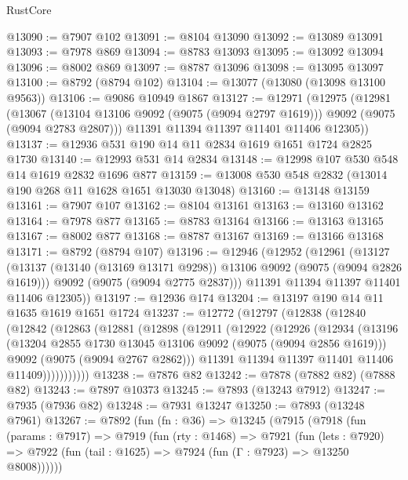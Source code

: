 \begin{lexlean}{RustCore}
\begin{coremodule}
@13090 := @7907 @102
@13091 := @8104 @13090
@13092 := @13089 @13091
@13093 := @7978 @869
@13094 := @8783 @13093
@13095 := @13092 @13094
@13096 := @8002 @869
@13097 := @8787 @13096
@13098 := @13095 @13097
@13100 := @8792 (@8794 @102)
@13104 := @13077 (@13080 (@13098 @13100 @9563))
@13106 := @9086 @10949 @1867
@13127 := @12971
    (@12975
      (@12981
        (@13067 (@13104 @13106 @9092 (@9075 (@9094 @2797 @1619))) @9092 (@9075 (@9094 @2783 @2807)))
        @11391
        @11394
        @11397
        @11401
        @11406
        @12305))
@13137 := @12936 @531 @190 @14 @11 @2834 @1619 @1651 @1724 @2825 @1730
@13140 := @12993 @531 @14 @2834
@13148 := @12998 @107 @530 @548 @14 @1619 @2832 @1696 @877
@13159 := @13008 @530 @548 @2832 (@13014 @190 @268 @11 @1628 @1651 @13030 @13048)
@13160 := @13148 @13159
@13161 := @7907 @107
@13162 := @8104 @13161
@13163 := @13160 @13162
@13164 := @7978 @877
@13165 := @8783 @13164
@13166 := @13163 @13165
@13167 := @8002 @877
@13168 := @8787 @13167
@13169 := @13166 @13168
@13171 := @8792 (@8794 @107)
@13196 := @12946
    (@12952
      (@12961
        (@13127
          (@13137 (@13140 (@13169 @13171 @9298)) @13106 @9092 (@9075 (@9094 @2826 @1619)))
          @9092
          (@9075 (@9094 @2775 @2837)))
        @11391
        @11394
        @11397
        @11401
        @11406
        @12305))
@13197 := @12936 @174
@13204 := @13197 @190 @14 @11 @1635 @1619 @1651 @1724
@13237 := @12772
    (@12797
      (@12838
        (@12840
          (@12842
            (@12863
              (@12881
                (@12898
                  (@12911
                    (@12922
                      (@12926
                        (@12934
                          (@13196
                            (@13204 @2855 @1730 @13045 @13106 @9092 (@9075 (@9094 @2856 @1619)))
                            @9092
                            (@9075 (@9094 @2767 @2862)))
                          @11391
                          @11394
                          @11397
                          @11401
                          @11406
                          @11409)))))))))))
@13238 := @7876 @82
@13242 := @7878 (@7882 @82) (@7888 @82)
@13243 := @7897 @10373
@13245 := @7893 (@13243 @7912)
@13247 := @7935 (@7936 @82)
@13248 := @7931 @13247
@13250 := @7893 (@13248 @7961)
@13267 := @7892
    (fun (fn : @36) =>
    @13245
      (@7915
        (@7918
          (fun (params : @7917) =>
          @7919
            (fun (rty : @1468) =>
            @7921
              (fun (lets : @7920) =>
              @7922 (fun (tail : @1625) => @7924 (fun (Γ : @7923) => @13250 @8008))))))

\end{coremodule}
\end{lexlean}
